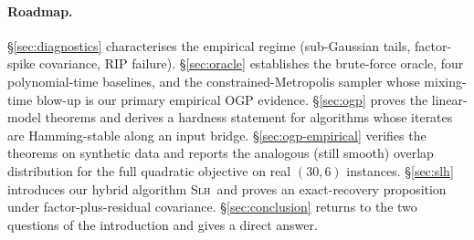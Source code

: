 \documentclass[11pt]{article}
\begin{document}
\paragraph{Roadmap.}\S\ref{sec:diagnostics} characterises the empirical regime
(sub-Gaussian tails, factor-spike covariance, RIP failure). \S\ref{sec:oracle} establishes
the brute-force oracle, four polynomial-time baselines, and the constrained-Metropolis
sampler whose mixing-time blow-up is our primary empirical OGP evidence.
\S\ref{sec:ogp} proves the linear-model theorems and derives a hardness statement for
algorithms whose iterates are Hamming-stable along an input bridge.
\S\ref{sec:ogp-empirical} verifies the theorems on synthetic data and reports the
analogous (still smooth) overlap distribution for the full quadratic objective on real
$(30,6)$ instances. \S\ref{sec:slh} introduces our hybrid algorithm \textsc{Slh}\ and
proves an exact-recovery proposition under factor-plus-residual covariance.
\S\ref{sec:conclusion} returns to the two questions of the introduction and gives a
direct answer.












\end{document}
